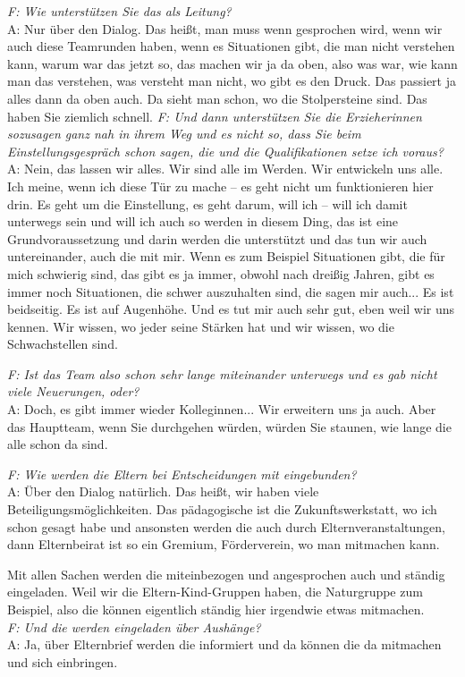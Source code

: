\begin{linenumbers*}
\emph{F: Wie unterstützen Sie das als Leitung?}\\
A: Nur über den Dialog. Das heißt, man muss wenn gesprochen wird, wenn wir auch diese Teamrunden haben, wenn es Situationen gibt, die man nicht verstehen kann, warum war das jetzt so, das machen wir ja da oben, also was war, wie kann man das verstehen, was versteht man nicht, wo gibt es den Druck. Das passiert ja alles dann da oben auch. Da sieht man schon, wo die Stolpersteine sind. Das haben Sie ziemlich schnell. 
\emph{F: Und dann unterstützen Sie die Erzieherinnen sozusagen ganz nah in ihrem Weg und es nicht so, dass Sie beim Einstellungsgespräch schon sagen, die und die Qualifikationen setze ich voraus?}\\
A: Nein, das lassen wir alles. Wir sind alle im Werden. Wir entwickeln uns alle. Ich meine, wenn ich diese Tür zu mache -- es geht nicht um funktionieren hier drin. Es geht um die Einstellung, es geht darum, will ich -- will ich damit unterwegs sein und will ich auch so werden in diesem Ding, das ist eine Grundvoraussetzung und darin werden die unterstützt und das tun wir auch untereinander, auch die mit mir. 
Wenn es zum Beispiel Situationen gibt, die für mich schwierig sind, das gibt es ja immer, obwohl nach dreißig Jahren, gibt es immer noch Situationen, die schwer auszuhalten sind, die sagen mir auch... Es ist beidseitig. Es ist auf Augenhöhe. Und es tut mir auch sehr gut, eben weil wir uns kennen. Wir wissen, wo jeder seine Stärken hat und wir wissen, wo die Schwachstellen sind. 

\emph{F: Ist das Team also schon sehr lange miteinander unterwegs und es gab nicht viele Neuerungen, oder?}\\
A: Doch, es gibt immer wieder Kolleginnen... Wir erweitern uns ja auch. Aber das Hauptteam, wenn Sie durchgehen würden, würden Sie staunen, wie lange die alle schon da sind.

\emph{F: Wie werden die Eltern bei Entscheidungen mit eingebunden?}\\
A: Über den Dialog natürlich. Das heißt, wir haben viele Beteiligungsmöglichkeiten. Das pädagogische ist die Zukunftswerkstatt, wo ich schon gesagt habe und ansonsten werden die auch durch Elternveranstaltungen, dann Elternbeirat ist so ein Gremium, Förderverein, wo man mitmachen kann.

Mit allen Sachen werden die miteinbezogen und angesprochen auch und ständig eingeladen. Weil wir die Eltern-Kind-Gruppen haben, die Naturgruppe zum Beispiel, also die können eigentlich ständig hier irgendwie etwas mitmachen.\\
\emph{F: Und die werden eingeladen über Aushänge?}\\
A: Ja, über Elternbrief werden die informiert und da können die da mitmachen und sich einbringen.


\end{linenumbers*}
